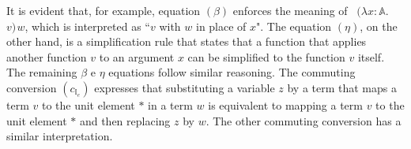 It is evident that, for example, equation $(\beta)$ enforces the meaning of  $(\lambda x : \mathbb{A}.$ $v) \hspace{1pt} w $, which is interpreted as ``$v$ with $w$ in place of $x$". The equation $(\eta)$, on the other hand, is a simplification rule that states that a function that applies another function $v$ to an argument $x$ can be simplified to the function $v$ itself. The remaining $\beta$ e $\eta$ equations follow similar reasoning. The commuting conversion $(c_{\mathbb{I}_{e}})$ expresses that substituting a variable $z$ by a term that maps a term $v$ to the unit element $*$ in a term $w$ is equivalent to mapping a term $v$ to the unit element $*$ and then replacing $z$ by $w$. The other commuting conversion has a similar interpretation.



